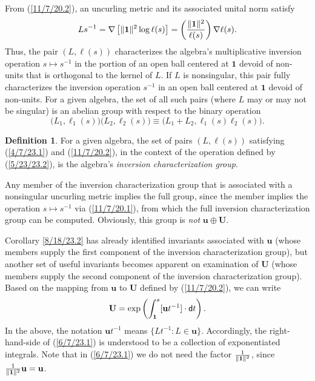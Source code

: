 \documentclass{amsart}
\numberwithin{equation}{section}
\theoremstyle{definition}
\newtheorem{definition}[theorem]{Definition}
\numberwithin{theorem}{section}
\begin{document}
  
    From (\ref{11/7/20.2}), an uncurling metric and its associated unital norm satisfy  \begin{equation}\label{11/7/20.1} Ls^{-1}  = \nabla\left[\|{\bf 1}\|^2\log  \ell(s)\right] =   \left(\frac{\|{\bf 1}\|^2}{ \ell(s)}\right)\nabla \ell(s).\end{equation} 
Thus, the pair $(L, \ell(s))$ characterizes the algebra's multiplicative inversion operation $s\mapsto s^{-1}$ in the portion of an open ball centered at $\mathbf{1}$ devoid of non-units that is orthogonal to the kernel of $L$.  If $L$ is nonsingular, this pair fully characterizes the inversion operation $s^{-1}$ in an open ball centered at $\mathbf{1}$ devoid of non-units.  For a given algebra, the set of all such pairs (where $L$ may or may not be singular) is an abelian group with respect to the binary operation 
\begin{equation}\label{5/23/23.2} \big(L_1, \ell_1(s)\big)\big(L_2, \ell_2(s)\big) \equiv 
\big(L_1+L_2, \ell_1(s)  \ell_2(s)\big).\end{equation} 
\begin{definition} For a given algebra, the set of pairs $(L, \ell(s))$ satisfying (\ref{4/7/23.1}) and (\ref{11/7/20.2}), in the context of the operation defined by (\ref{5/23/23.2}), is the algebra's {\it inversion characterization group}. \end{definition}

Any member of the inversion characterization group that is associated with a nonsingular uncurling metric implies the full group, since the member implies the operation $s\mapsto s^{-1}$ via (\ref{11/7/20.1}), from which the full inversion characterization group can be computed.  Obviously, this group is {\it not} $\mathbf{u}\oplus\mathbf{U}$. 

Corollary \ref{8/18/23.2} has already identified invariants associated with $\mathbf{u}$ (whose members supply the first component of the inversion characterization group), but another set of useful invariants becomes apparent on examination of $\mathbf{U}$ (whose members supply the second component of the inversion characterization group).  Based on the mapping from $\mathbf{u}$ to $\mathbf{U}$ defined by (\ref{11/7/20.2}),  we can write \begin{equation}  \mathbf{U} = \exp\left(\int_{\bf 1}^s [\mathbf{u}t^{-1}]\cdot {\sf d}t\right). \label{6/7/23.1}\end{equation}  In the above, the notation $\mathbf{u}t^{-1}$ means $\{Lt^{-1}: L\in \mathbf{u}\}$.  Accordingly, the right-hand-side of (\ref{6/7/23.1}) is understood to be a collection of exponentiated integrals.   Note that in (\ref{6/7/23.1}) we do not need the factor $\frac{1}{\|{\bf 1}\|^2}$, since $\frac{1}{\|{\bf 1}\|^2}\mathbf{u}=\mathbf{u}$.  
\end{document}
